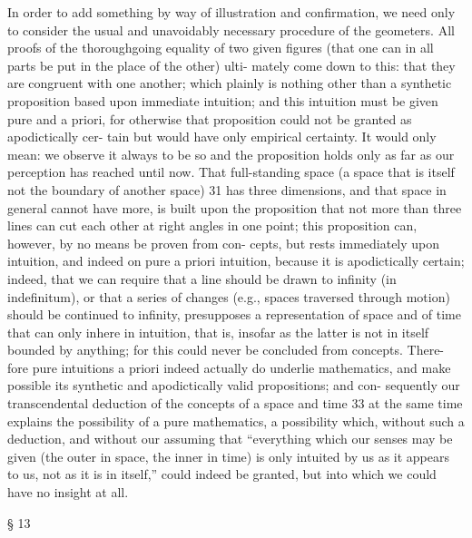 In order to add something by way of illustration and conﬁrmation, we
need only to consider the usual and unavoidably necessary procedure of
the geometers. All proofs of the thoroughgoing equality of two given
ﬁgures (that one can in all parts be put in the place of the other) ulti-
mately come down to this: that they are congruent with one another;
which plainly is nothing other than a synthetic proposition based upon
immediate intuition; and this intuition must be given pure and a priori,
for otherwise that proposition could not be granted as apodictically cer-
tain but would have only empirical certainty. It would only mean: we
observe it always to be so and the proposition holds only as far as our
perception has reached until now. That full-standing space (a space that
is itself not the boundary of another space) 31 has three dimensions, and
that space in general cannot have more, is built upon the proposition
that not more than three lines can cut each other at right angles in one
point; this proposition can, however, by no means be proven from con-
cepts, but rests immediately upon intuition, and indeed on pure a priori
intuition, because it is apodictically certain; indeed, that we can require
that a line should be drawn to inﬁnity (in indeﬁnitum), or that a series of
changes (e.g., spaces traversed through motion) should be continued to
inﬁnity, presupposes a representation of space and of time that can only
inhere in intuition, that is, insofar as the latter is not in itself bounded
by anything; for this could never be concluded from concepts. There-
fore pure intuitions a priori indeed actually do underlie mathematics, and
make possible its synthetic and apodictically valid propositions; and con-
sequently our transcendental deduction of the concepts of a space and
time 33 at the same time explains the possibility of a pure mathematics, a
possibility which, without such a deduction, and without our assuming
that “everything which our senses may be given (the outer in space, the
inner in time) is only intuited by us as it appears to us, not as it is in itself,”
could indeed be granted, but into which we could have no insight at all.

§ 13

